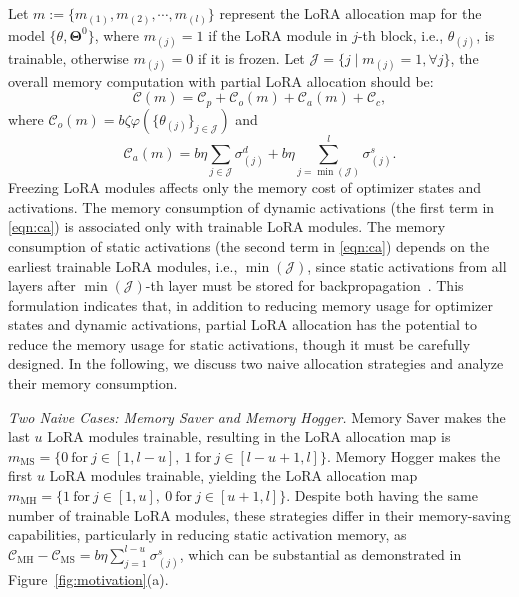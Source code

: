 \documentclass[sigconf]{acmart}
\begin{document}
Let $m:=\{m_{(1)}, m_{(2)}, \cdots, m_{(l)}\}$ represent the LoRA allocation map for the model $\{\boldsymbol{\mathcal{\theta}}, \boldsymbol{\Theta}^0\}$, where $m_{{(j)}}=1$ if the LoRA module in $j$-th block, i.e., $\boldsymbol{\mathcal{\theta}}_{(j)}$, is trainable, otherwise $m_{{(j)}}=0$ if it is frozen. Let $\mathcal{J} = \{ j \mid m_{(j)} = 1,\forall j\}$, the overall memory computation with partial LoRA allocation should be: 
\begin{equation}\label{eq:memory_model2}
    \mathcal{C}(m)=\mathcal{C}_p +\mathcal{C}_o (m) +\mathcal{C}_a (m)+\mathcal{C}_c, 
\end{equation} where $\mathcal{C}_{o} (m) =  b\zeta \varphi(\{\boldsymbol{\mathcal{\theta}}_{(j)}\}_{j\in\mathcal
J})$ and
\begin{equation}\label{eqn:ca}
\mathcal{C}_{a} (m) = b\eta\sum_{j \in \mathcal{J}} \sigma_{(j)}^{d}
 + {b\eta\sum_{j=\min(\mathcal{J})
}^{l}} \sigma_{(j)}^{s}. 
\end{equation}
Freezing LoRA modules affects only the memory cost of optimizer states and activations. The memory consumption of dynamic activations (the first term in \eqref{eqn:ca}) is associated only with trainable LoRA modules. The memory consumption of static activations (the second term in \eqref{eqn:ca}) depends on the earliest trainable LoRA modules, i.e., $\min(\mathcal{J})$, since static activations from all layers after $\min(\mathcal{J})$-th layer must be stored for backpropagation~\cite{ardakani2024slimfit}. This formulation indicates that, in addition to reducing memory usage for optimizer states and dynamic activations, partial LoRA allocation has the potential to reduce the memory usage for static activations, though it must be carefully designed. In the following, we discuss two naive allocation strategies and analyze their memory consumption. 

\textit{Two Naive Cases: Memory Saver and Memory Hogger.} 
Memory Saver makes the last $u$ LoRA modules trainable, resulting in the LoRA allocation map is $m_{\text{MS}}= \{0 \ \text{for} \ j \in [1, l-u], \ 1 \ \text{for} \ j \in [l-u+1, l]\}$. Memory Hogger makes the first $u$ LoRA modules trainable, yielding the LoRA allocation map $m_{\text{MH}}= \{1 \ \text{for} \ j \in [1, u], \ 0 \ \text{for} \ j \in [u+1, l]\}$. Despite both having the same number of trainable LoRA modules, these strategies differ in their memory-saving capabilities, particularly in reducing static activation memory, as $\mathcal{C}_{\text{MH}}-\mathcal{C}_{\text{MS}}={b\eta\sum_{j=1
}^{l-u}} \sigma_{(j)}^{s}$, which can be substantial as demonstrated in Figure~\ref{fig:motivation}(a).
\end{document}
